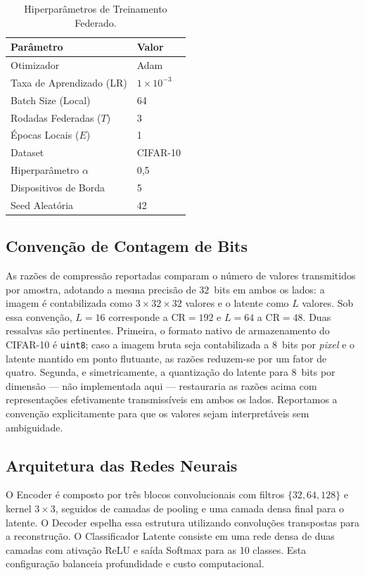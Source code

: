 \documentclass[conference,twocolumn]{IEEEtran}
\begin{document}
\begin{table}[ht]
\centering
\caption{Hiperparâmetros de Treinamento Federado.}
\label{tab:params}
\begin{tabular}{ll}
\toprule
\textbf{Parâmetro} & \textbf{Valor} \\
\midrule
Otimizador & Adam \\
Taxa de Aprendizado (LR) & $1 \times 10^{-3}$ \\
Batch Size (Local) & 64 \\
Rodadas Federadas ($T$) & 3 \\
Épocas Locais ($E$) & 1 \\
Dataset & CIFAR-10 \\
Hiperparâmetro $\alpha$ & 0,5 \\
Dispositivos de Borda & 5 \\
Seed Aleatória & 42 \\
\bottomrule
\end{tabular}
\end{table}

\subsection{Convenção de Contagem de Bits}
\label{subsec:bits}
As razões de compressão reportadas comparam o número de valores transmitidos por amostra, adotando a mesma precisão de $32$~bits em ambos os lados: a imagem é contabilizada como $3 \times 32 \times 32$ valores e o latente como $L$ valores. Sob essa convenção, $L=16$ corresponde a $\mathrm{CR}=192$ e $L=64$ a $\mathrm{CR}=48$. Duas ressalvas são pertinentes. Primeira, o formato nativo de armazenamento do CIFAR-10 é \texttt{uint8}; caso a imagem bruta seja contabilizada a $8$~bits por \textit{pixel} e o latente mantido em ponto flutuante, as razões reduzem-se por um fator de quatro. Segunda, e simetricamente, a quantização do latente para $8$~bits por dimensão --- não implementada aqui --- restauraria as razões acima com representações efetivamente transmissíveis em ambos os lados. Reportamos a convenção explicitamente para que os valores sejam interpretáveis sem ambiguidade.

\subsection{Arquitetura das Redes Neurais}
O Encoder é composto por três blocos convolucionais com filtros $\{32, 64, 128\}$ e kernel $3 \times 3$, seguidos de camadas de pooling e uma camada densa final para o latente. O Decoder espelha essa estrutura utilizando convoluções transpostas para a reconstrução. O Classificador Latente consiste em uma rede densa de duas camadas com ativação ReLU e saída Softmax para as 10 classes. Esta configuração balanceia profundidade e custo computacional.
\end{document}
